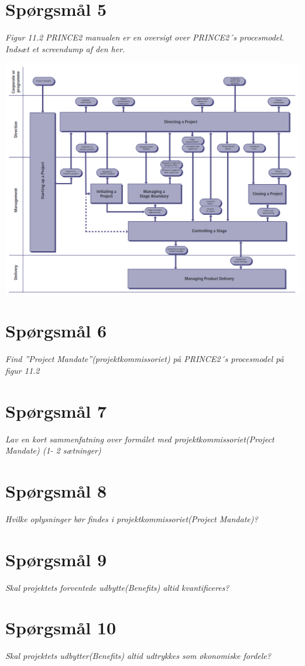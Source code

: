 \section{Spørgsmål 5}
\textit{Figur 11.2 PRINCE2 manualen er en oversigt over PRINCE2´s procesmodel. Indsæt et screendump af den her.}

\includegraphics{prince2.includes/figure112.png}

\section{Spørgsmål 6}
\textit{Find ”Project Mandate”(projektkommissoriet) på PRINCE2´s procesmodel på figur 11.2}
\section{Spørgsmål 7}
\textit{Lav en kort sammenfatning over formålet med projektkommissoriet(Project Mandate) (1- 2 sætninger)}
\section{Spørgsmål 8}
\textit{Hvilke oplysninger bør findes i projektkommissoriet(Project Mandate)?}
\section{Spørgsmål 9}
\textit{Skal projektets forventede udbytte(Benefits) altid kvantificeres?}
\section{Spørgsmål 10}
\textit{Skal projektets udbytter(Benefits) altid udtrykkes som økonomiske fordele?}
